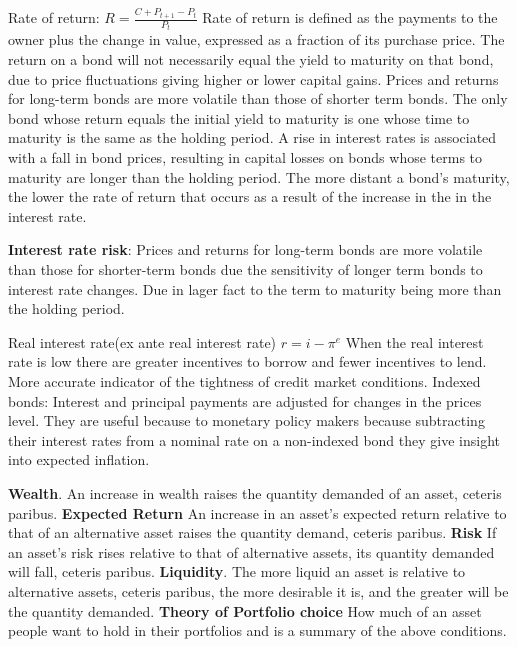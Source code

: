 \documentclass[12pt]{examnotes}
\begin{document}
Rate of return: $R=\displaystyle \frac{C+P_{t+1}-P_t}{P_t}$
Rate of return is defined as the payments to the owner plus the change in value, expressed as a fraction of its purchase price.
The return on a bond will not necessarily equal the yield to maturity on that bond, due to price fluctuations giving higher or lower capital gains. Prices and returns for long-term bonds are more volatile than those of shorter term bonds. 
The only bond whose return equals the initial yield to maturity is one whose time to maturity is the same as the holding period.
A rise in interest rates is associated with a fall in bond prices, resulting in capital losses on bonds whose terms to maturity are longer than the holding period.
The more distant a bond's maturity, the lower the rate of return that occurs as a result of the increase in the in the interest rate. 

\textbf{Interest rate risk}: Prices and returns for long-term bonds are more volatile than those for shorter-term bonds due the sensitivity of longer term bonds to interest rate changes. Due in lager fact to the term to maturity being more than the holding period.

Real interest rate(ex ante real interest rate) $r=i-\pi^e$ 
When the real interest rate is low there are greater incentives to borrow and fewer incentives to lend. 
More accurate indicator of the tightness of credit market conditions. 
Indexed bonds: Interest and principal payments are adjusted for changes in the prices level. They are useful because to monetary policy makers because subtracting their interest rates from a nominal rate on a non-indexed bond they give insight into expected inflation.

\textbf{Wealth}. An increase in wealth raises the quantity demanded of an asset, ceteris paribus. 
\textbf{Expected Return} An increase in an asset's expected return relative to that of an alternative asset raises the quantity demand, ceteris paribus. 
\textbf{Risk} If an asset's risk rises relative to that of alternative assets, its quantity demanded will fall, ceteris paribus. 
\textbf{Liquidity}. The more liquid an asset is relative to alternative assets, ceteris paribus, the more desirable it is, and the greater will be the quantity demanded. 
\textbf{Theory of Portfolio choice} How much of an asset people want to hold in their portfolios and is a summary of the above conditions. 
\end{document}
